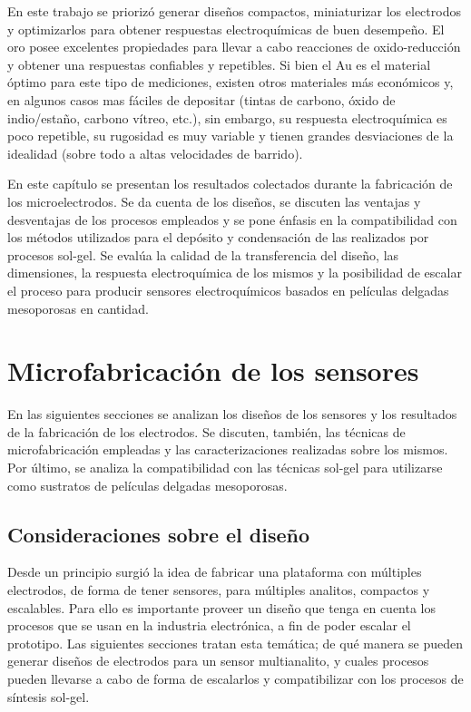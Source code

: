 	En este trabajo se priorizó generar diseños compactos, miniaturizar los electrodos y optimizarlos para obtener respuestas electroquímicas de buen desempeño. El oro posee excelentes propiedades para llevar a cabo reacciones de oxido-reducción y obtener una respuestas confiables y repetibles. Si bien el Au es el material óptimo para este tipo de mediciones, existen otros materiales más económicos y, en algunos casos mas fáciles de depositar (tintas de carbono, óxido de indio/estaño, carbono vítreo, etc.), sin embargo, su respuesta electroquímica es poco repetible, su rugosidad es muy variable y tienen grandes desviaciones de la idealidad (sobre todo a altas velocidades de barrido).\cite{Wi2000,Villullas2000}

	En este capítulo se presentan los resultados colectados durante la fabricación de los microelectrodos. Se da cuenta de los diseños, se discuten las ventajas y desventajas de los procesos empleados y se pone énfasis en la compatibilidad con los métodos utilizados para el depósito y condensación de las \pdm\space realizados por procesos sol-gel. Se evalúa la calidad de la transferencia del diseño, las dimensiones, la respuesta electroquímica de los mismos y la posibilidad de escalar el proceso para producir sensores electroquímicos basados en películas delgadas mesoporosas en cantidad.
	
\section{Microfabricación de los sensores}\label{sec:microfabricaci_n_de_los_sensores}
		
	 	 En las siguientes secciones se analizan los diseños de los sensores y los resultados de la fabricación de los electrodos. Se discuten, también, las técnicas de microfabricación empleadas y las caracterizaciones realizadas sobre los mismos. Por último, se analiza la compatibilidad con las técnicas sol-gel para utilizarse como sustratos de películas delgadas mesoporosas.

  		\subsection{Consideraciones sobre el diseño}\label{sec:diseno}

			 Desde un principio surgió la idea de fabricar una plataforma con múltiples electrodos, de forma de tener sensores, para múltiples analitos, compactos y escalables. Para ello es importante proveer un diseño que tenga en cuenta los procesos que se usan en la industria electrónica, a fin de poder escalar el prototipo. Las siguientes secciones tratan esta temática; de qué manera se pueden generar diseños de electrodos para un sensor multianalito, y cuales procesos pueden llevarse a cabo de forma de escalarlos y compatibilizar con los procesos de síntesis sol-gel.


